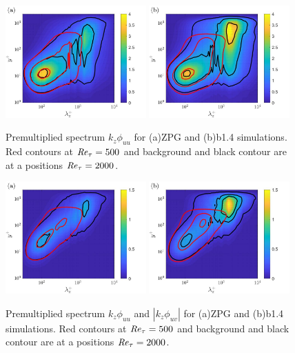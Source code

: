 \begin{figure}[h!]
\centering
\includegraphics[width=0.48\textwidth]{ZPG_uu.jpg}
\includegraphics[width=0.48\textwidth]{APG_uu.jpg}
\caption{ \label{fig:ZPG_APG_Ret_500_2000_uu} Premultiplied spectrum $k_z\phi_{uu}$ for (a)ZPG and (b)b1.4 simulations. Red contours at $\mbox{\textit{Re}}_{\tau}=500$ and background and black contour are at a positions $\mbox{\textit{Re}}_{\tau}=2000$. }
\end{figure}

\begin{figure}[h!]
\centering
\includegraphics[width=0.48\textwidth]{ZPG_uv.jpg}
\includegraphics[width=0.48\textwidth]{APG_uv.jpg}
\caption{ \label{fig:ZPG_APG_Ret_500_2000_uv} Premultiplied spectrum $k_z\phi_{uu}$ and $|k_z\phi_{uv}|$ for (a)ZPG and (b)b1.4 simulations. Red contours at $\mbox{\textit{Re}}_{\tau}=500$ and background and black contour are at a positions $\mbox{\textit{Re}}_{\tau}=2000$. }
\end{figure}

